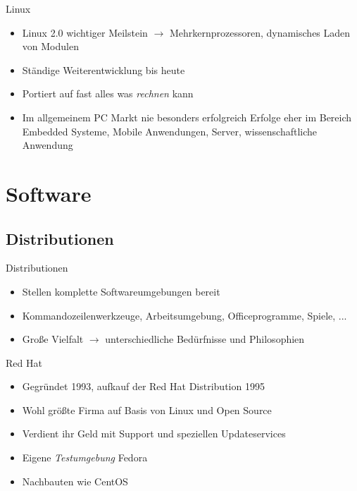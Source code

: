 \documentclass[aspectratio=43]{beamer}
\begin{document}
\begin{frame} 

	\begin{block}{Linux} 
	\begin{itemize}
	\item Linux 2.0 wichtiger Meilstein
	\newline $\rightarrow$  Mehrkernprozessoren, dynamisches Laden von Modulen
	\item Ständige Weiterentwicklung bis heute
	\item Portiert auf fast alles was \textit{rechnen} kann
	\item Im allgemeinem PC Markt nie besonders erfolgreich
	\newline Erfolge eher im Bereich Embedded Systeme, Mobile Anwendungen, Server, wissenschaftliche Anwendung
	\end{itemize}
	\end{block}

\end{frame}

\section{Software}
\subsection{Distributionen}
\begin{frame} 

	\begin{block}{Distributionen} 
	\begin{itemize}
	\item Stellen komplette Softwareumgebungen bereit
	\item Kommandozeilenwerkzeuge, Arbeitsumgebung, Officeprogramme, Spiele, ...
	\item Große Vielfalt
	\newline $\rightarrow$ unterschiedliche Bedürfnisse und Philosophien 
	\end{itemize}
	\end{block}

	\begin{block}{Red Hat} 
	\begin{itemize}
	\item Gegründet 1993, aufkauf der Red Hat Distribution 1995
	\item Wohl größte Firma auf Basis von Linux und Open Source
	\item Verdient ihr Geld mit Support und speziellen Updateservices
	\item Eigene \textit{Testumgebung} Fedora
	\item Nachbauten wie CentOS
	\end{itemize}
	\end{block}

	
\end{frame}
\end{document}
